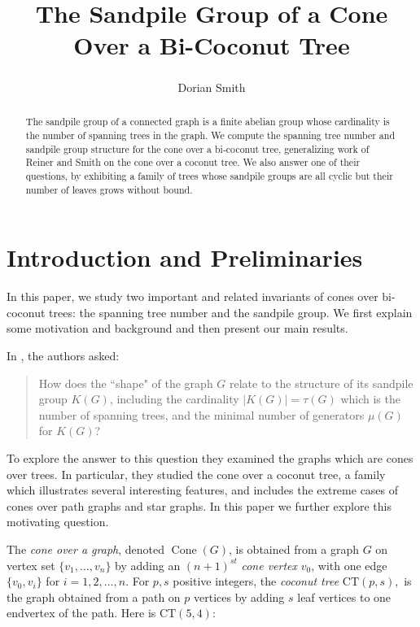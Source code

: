 \documentclass[10pt,reqno]{amsart}
\author{
  Dorian Smith \textsuperscript{\textdagger}}
\DeclareMathOperator{\Cone}{Cone}
\newcommand{\CT}[2]{\mathrm{CT}(#1,#2)}
\begin{document}
\title{The Sandpile Group of a  Cone Over a Bi-Coconut Tree}


\begin{abstract}
 The sandpile group of a connected graph is a finite abelian group whose cardinality is the number of spanning trees in the graph.  We compute the spanning tree number and sandpile group structure for the cone over a bi-coconut tree, generalizing work of Reiner and Smith on the cone over a coconut tree.  We also answer one of their questions,
 by exhibiting a family of trees whose sandpile groups are all cyclic but their number of leaves grows without bound.
\end{abstract}

\maketitle

\section{Introduction and Preliminaries}


 In this paper,
we study two important and related invariants of  cones over bi-coconut trees: the spanning tree number and the sandpile group.
 We first explain some motivation and background and then present our
main results.

In \cite{Reiner2024SandpileGF}, the authors asked:
\begin{quote}
How does the ``shape" of the graph $G$ relate to the structure of its
sandpile group $K(G)$, including
the cardinality $|K(G)|=\tau(G)$ which is the number of spanning trees, and the minimal number of generators $\mu(G)$ for $K(G)$? 
\end{quote}
To explore the answer to this  question they examined the graphs which are cones over trees. In particular, they studied the cone over a coconut tree, a family which illustrates several interesting features,
and includes the extreme cases of cones over path graphs and star graphs. In this paper we further explore this motivating question.

The {\it cone over a graph}, denoted $\Cone(G)$, 
is obtained from a graph $G$ on vertex set $\{v_1,\ldots,v_n\}$ by adding an $(n+1)^{st}$ {\it cone vertex} $v_0$, with one edge $\{v_0,v_i\}$
for $i=1,2,\ldots,n.$ 
For $p,s$ positive integers, the {\it coconut tree} $\CT ps,$ is the graph  obtained from a
path on $p$ vertices by adding $s$  leaf vertices to  one endvertex of the path.  Here is $\CT 54$:
\vspace{.75cm}
\end{document}
